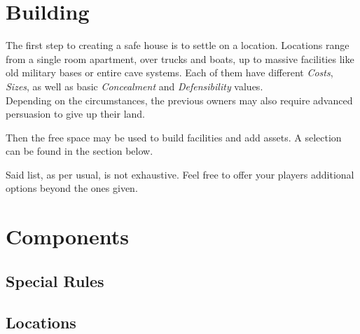 \documentclass[12pt,a4paper,openany,usenames,dvipsnames]{book}
\begin{document}
	\chapter{Building}
	The first step to creating a safe house is to settle on a location.
	Locations range from a single room apartment,
		over trucks and boats,
		up to massive facilities like old military bases or entire cave systems.
	Each of them have different \emph{Costs}, \emph{Sizes},
		as well as basic \emph{Concealment} and \emph{Defensibility} values.\\
	Depending on the circumstances, the previous owners may also require advanced persuasion to give up their land.
	\par
	Then the free space may be used to build facilities and add assets.
	A selection can be found in the section below.\\
	\begin{exampleblock}
			Said list, as per usual, is not exhaustive.
			Feel free to offer your players additional options beyond the ones given.
	\end{exampleblock}

	\chapter{Components}
	\section{Special Rules} \vspace{8mm}
	\begin{multicols}{2}
	\end{multicols}

	\section{Locations} \vspace{5mm}
	\begin{multicols}{2}
	\end{multicols}
\end{document}
